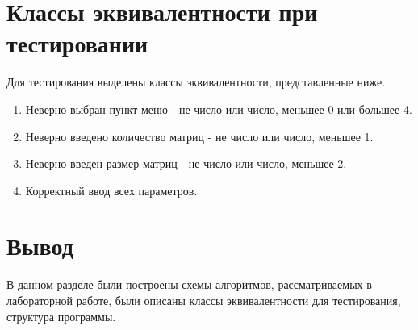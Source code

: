 \clearpage


\section{Классы эквивалентности при тестировании}

Для тестирования выделены классы эквивалентности, представленные ниже.

\begin{enumerate}
	\item Неверно выбран пункт меню - не число или число, меньшее 0 или большее 4.
	\item Неверно введено количество матриц - не число или число, меньшее 1.
	\item Неверно введен размер матриц - не число или число, меньшее 2.
	\item Корректный ввод всех параметров.
\end{enumerate}


\section{Вывод}

В данном разделе были построены схемы алгоритмов, рассматриваемых в лабораторной работе, были описаны классы эквивалентности для тестирования, структура программы.
